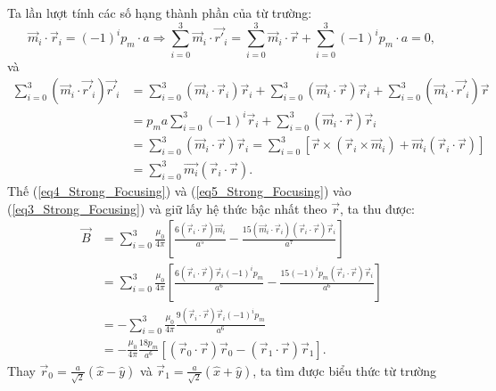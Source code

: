 \begin{enumerate}
\begin{equation}
    \end{equation}
    Ta lần lượt tính các số hạng thành phần của từ trường:
    \begin{equation} \label{eq4_Strong_Focusing}
        \Vec{m}_i\cdot \Vec{r}_i= (-1)^ip_m \cdot a\Longrightarrow \sum_{i=0}^{3}\Vec{m}_i \cdot \Vec{r'}_i= \sum_{i=0}^{3}\Vec{m}_i \cdot \Vec{r}+\sum_{i=0}^{3}(-1)^ip_m \cdot a=0,
    \end{equation}
    và
    \begin{equation} \label{eq5_Strong_Focusing}
    \begin{split}
        \sum_{i=0}^{3}(\Vec{m}_i \cdot \Vec{r'}_i)\Vec{r'}_i &=\sum_{i=0}^{3}(\Vec{m}_i \cdot \Vec{r}_i)\Vec{r}_i+\sum_{i=0}^{3}(\Vec{m}_i \cdot \Vec{r})\Vec{r}_i+\sum_{i=0}^{3}(\Vec{m}_i \cdot \Vec{r'}_i)\Vec{r}\\
        &=p_ma\sum_{i=0}^{3}(-1)^i\Vec{r}_i+\sum_{i=0}^{3}(\Vec{m}_i \cdot \Vec{r})\Vec{r}_i \\
        &=\sum_{i=0}^{3}(\Vec{m}_i\cdot \Vec{r})\Vec{r}_i= \sum_{i=0}^{3}\left[\Vec{r}\times (\Vec{r}_i \times\Vec{m}_i)+\Vec{m}_i(\Vec{r}_i \cdot\Vec{r})\right]\\
        &=\sum_{i=0}^{3}\Vec{m_i}(\Vec{r}_i \cdot\Vec{r}).
    \end{split}
    \end{equation}
    Thế (\ref{eq4_Strong_Focusing}) và (\ref{eq5_Strong_Focusing}) vào (\ref{eq3_Strong_Focusing}) và giữ lấy hệ thức bậc nhất theo $\Vec{r}$, ta thu được:
    \begin{equation} \label{eq6_Strong_Focusing}
        \begin{split}
            \Vec{B}&= \sum_{i=0}^{3} \frac{\mu_0}{4\pi}\left[\frac{6(\Vec{r}_i \cdot \Vec{r})\Vec{m}_i}{a^5}-\frac{15(\Vec{m}_i \cdot \Vec{r}_i )(\Vec{r}_i \cdot \Vec{r})\Vec{r}_i}{a^7}\right]\\
            &=\sum_{i=0}^{3} \frac{\mu_0}{4\pi}\left[\frac{6(\Vec{r}_i\cdot \Vec{r})\Vec{r}_i(-1)^ip_m}{a^6}-\frac{15(-1)^ip_m(\Vec{r}_i \cdot \Vec{r})\Vec{r}_i}{a^6}\right]\\
            &=-\sum_{i=0}^{3} \frac{\mu_0}{4\pi}\frac{9(\Vec{r}_i\cdot \Vec{r})\Vec{r}_i (-1)^ip_m}{a^6}\\
            &=- \frac{\mu_0}{4\pi}\frac{18p_m}{a^6}\left[(\Vec{r}_0 \cdot \Vec{r})\Vec{r}_0-(\Vec{r}_1\cdot \Vec{r})\Vec{r}_1 \right].
        \end{split}
    \end{equation} 
    Thay $\Vec{r}_0 = \frac{a}{\sqrt{2}}(\hat{x}-\hat{y})$ và $\Vec{r}_1= \frac{a}{\sqrt{2}}(\hat{x}+\hat{y})$, ta tìm được biểu thức từ trường

\end{enumerate}
